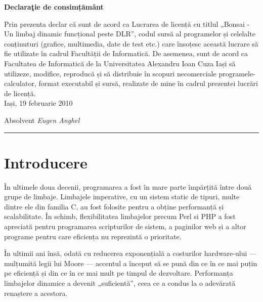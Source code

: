 \documentclass[12pt,a4paper]{memoir}
\begin{document}
\cleardoublepage
\thispagestyle{empty}
\begin{centering}
\LARGE{\textbf{Declaraţie de consimțământ}}
\end{centering}

\vspace{2cm}

Prin prezenta declar că sunt de acord ca Lucrarea de licență cu titlul „Bonsai - Un limbaj dinamic funcțional peste DLR”, codul sursă al programelor și celelalte conținuturi (grafice, multimedia, date de test etc.) care însoțesc această lucrare să fie utilizate în cadrul Facultății de Informatică. De asemenea, sunt de acord ca Facultatea de Informatică de la Universitatea Alexandru Ioan Cuza Iași să utilizeze, modifice, reproducă și să distribuie în scopuri necomerciale programele-calculator, format executabil și sursă, realizate de mine în cadrul prezentei lucrări de licență.
\\[2cm]
Iași, 19 februarie 2010
\\[1cm]
\begin{flushright}
Absolvent \emph{Eugen Anghel}\\[1.4cm]
\rule{0.31\linewidth}{0.2mm}
\end{flushright}
\cleardoublepage



\tableofcontents


\chapter{Introducere}

În ultimele doua decenii, programarea a fost în mare parte împărțită între două grupe de limbaje. Limbajele imperative, cu un sistem static de tipuri, multe dintre ele din familia C, au fost folosite pentru a obține performanță și scalabilitate. În schimb, flexibilitatea limbajelor precum Perl si PHP a fost apreciată pentru programarea scripturilor de sistem, a paginilor web și a altor programe pentru care eficiența nu reprezintă o prioritate.

În ultimii ani însă, odată cu reducerea exponențială a costurilor hardware-ului — mulțumită legii lui Moore — accentul a început să se pună din ce în ce mai puțin pe eficiență și din ce în ce mai mult pe timpul de dezvoltare. Performanța limbajelor dinamice a devenit „suficientă”, ceea ce a condus la o adevărată renaștere a acestora.
\end{document}
